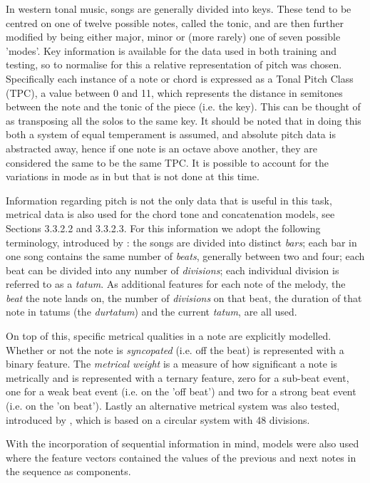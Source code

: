 \documentclass[bsc,singlespacing,parskip,deptreport,twoside,frontabs]{infthesis}
\begin{document}
In western tonal music, songs are generally divided into keys. These tend to be centred on one of twelve possible notes, called the tonic, and are then further modified by being either major, minor or (more rarely) one of seven possible 'modes'. Key information is available for the data used in both training and testing, so to normalise for this a relative representation of pitch was chosen. Specifically each instance of a note or chord is expressed as a Tonal Pitch Class (TPC), a value between 0 and 11, which represents the distance in semitones between the note and the tonic of the piece (i.e. the key). This can be thought of as transposing all the solos to the same key. It should be noted that in doing this both a system of equal temperament is assumed, and absolute pitch data is abstracted away, hence if one note is an octave above another, they are considered the same to be the same TPC. It is possible to account for the variations in mode as in \cite{mysong} but that is not done at this time.

Information regarding pitch is not the only data that is useful in this task, metrical data is also used for the chord tone and concatenation models, see Sections 3.3.2.2 and 3.3.2.3. For this information we adopt the following terminology, introduced by \cite{mel}: the songs are divided into distinct \emph{bars}; each bar in one song contains the same number of \emph{beats}, generally between two and four; each beat can be divided into any number of \emph{divisions}; each individual division is referred to as a \emph{tatum}. As additional features for each note of the melody, the \emph{beat} the note lands on, the number of \emph{divisions} on that beat, the duration of that note in tatums (the \emph{durtatum}) and the current \emph{tatum}, are all used.

On top of this, specific metrical qualities in a note are explicitly modelled. Whether or not the note is \emph{syncopated} (i.e. off the beat) is represented with a binary feature. The \emph{metrical weight} is a measure of how significant a note is metrically and is represented with a ternary feature, zero for a sub-beat event, one for a weak beat event (i.e. on the 'off beat') and two for a strong beat event (i.e. on the 'on beat'). Lastly an alternative metrical system was also tested, introduced by \cite{frieler2007visualizing}, which is based on a circular system with 48 divisions.

With the incorporation of sequential information in mind, models were also used where the feature vectors contained the values of the previous and next notes in the sequence as components.
\end{document}
